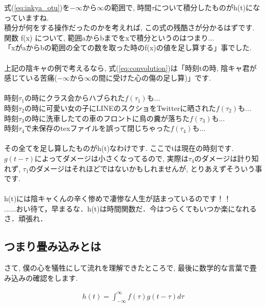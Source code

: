 \documentclass[11pt,a4paper]{jreport}
\begin{document}
式(\ref{eq:inkya_otu})を$-\infty$から$\infty$の範囲で, 時間$\tau$について積分したものがh(t)になっていますね.\\
積分が何をする操作だったのかを考えれば, この式の残酷さが分かるはずです.\\
関数 f(x) について, 範囲aからbまでをxで積分というのはつまり...\\
「xがaからbの範囲の全ての数を取った時のf(x)の値を足し算する」事でした. \\
\\
上記の陰キャの例で考えるなら, 式(\ref{eq:convolution})は「時刻tの時, 陰キャ君が感じている苦痛($-\infty$から$\infty$の間に受けた心の傷の足し算)」です.\\
\\
時刻$\tau_1$の時にクラス会からハブられた$f(\tau_1)$も...\\
時刻$\tau_2$の時に可愛い女の子にLINEのスクショをTwitterに晒された$f(\tau_2)$も...\\
時刻$\tau_3$の時に洗車したての車のフロントに鳥の糞が落ちた$f(\tau_3)$も...\\
時刻$\tau_4$で未保存のtexファイルを誤って閉じちゃった$f(\tau_4)$も...\\
\\
その全てを足し算したものがh(t)なわけです. ここでtは現在の時刻です. \\
$g(t-\tau)$によってダメージは小さくなってるので, 実際は$\tau_4$のダメージは計り知れず, $\tau_1$のダメージはそれほどではないかもしれませんが, とりあえずそういう事です. \\
\\
h(t)には陰キャくんの辛く惨めで凄惨な人生が詰まっているのです！！\\
......おい待て，早まるな．h(t)は時間関数だ．今はつらくてもいつか楽になれるさ．頑張れ．



\subsection{つまり畳み込みとは}
さて, 僕の心を犠牲にして流れを理解できたところで, 最後に数学的な言葉で畳み込みの確認をします.

\begin{eqnarray}
\label{eq:conv}
h(t) = \int^{\infty}_{-\infty} f(\tau) g(t - \tau) d\tau
\end{eqnarray}
\end{document}
